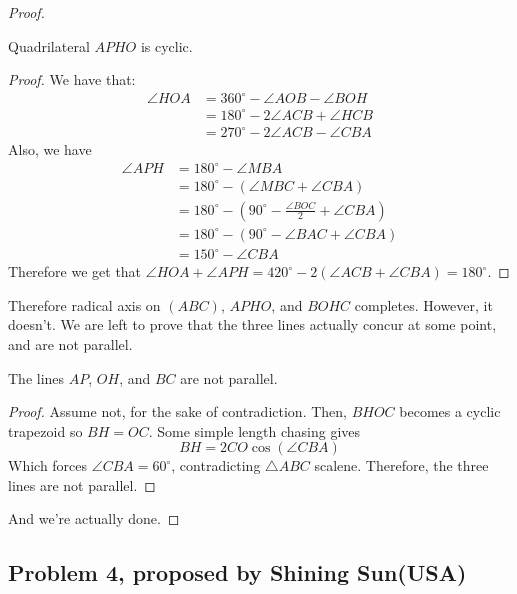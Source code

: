 \documentclass[11pt]{scrartcl}
\begin{document}
\begin{proof}
    \begin{claim}
        Quadrilateral $APHO$ is cyclic.
        \begin{proof}
            We have that:
            \begin{align*}
                \angle HOA &= 360^\circ - \angle AOB - \angle BOH\\ 
                &= 180^\circ - 2\angle ACB + \angle HCB \\ 
                &= 270^\circ - 2\angle ACB - \angle CBA
            \end{align*}
            Also, we have
            \begin{align*}
                \angle APH
                &= 180^\circ - \angle MBA \\ 
                &= 180^\circ - (\angle MBC + \angle CBA) \\
                &= 180^\circ - (90^\circ - \frac{\angle BOC}{2} + \angle CBA) \\
                &= 180^\circ - (90^\circ - \angle BAC + \angle CBA) \\
                &= 150^\circ - \angle CBA
            \end{align*}
            Therefore we get that $\angle HOA + \angle APH = 420^\circ - 2(\angle ACB + \angle CBA) = 180^\circ$.
        \end{proof}
    \end{claim}
    Therefore radical axis on $(ABC)$, $APHO$, and $BOHC$ completes. However, it doesn't. We are left to prove that the three
    lines actually concur at some point, and are not parallel.
    \begin{claim}
       The lines $AP$, $OH$, and $BC$ are not parallel.
        \begin{proof}
            Assume not, for the sake of contradiction. Then, $BHOC$ becomes a cyclic trapezoid so $BH=OC$. Some simple length
            chasing gives
            \[
            BH = 2 CO \cos(\angle CBA)
            \]
            Which forces $\angle CBA = 60^\circ$, contradicting $\triangle ABC$ scalene. Therefore, the three lines are not
                parallel.
        \end{proof}
    \end{claim}
    And we're actually done.
\end{proof}

\newpage{}

\subsection{Problem 4, proposed by Shining Sun(USA)}
\end{document}
